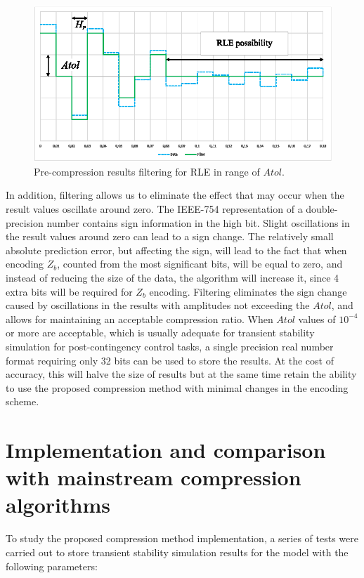 \documentclass[conference]{IEEEtran}
\begin{document}
\begin{figure}[htbp]
	\centering
	\includegraphics[width=0.8\columnwidth]{fig5.eps}
	\caption{Pre-compression results filtering for RLE in range of \(Atol\).}
	\label{fig_rle}
\end{figure}

In addition, filtering allows us to eliminate the effect that may occur when the result values oscillate around zero. 
The IEEE-754 representation of a double-precision number contains sign information in the high bit. 
Slight oscillations in the result values around zero can lead to a sign change. The relatively 
small absolute prediction error, but affecting the sign, will lead to the fact that when encoding \(Z_b\), 
counted from the most significant bits, will be equal to zero, and instead of reducing the size of the data, 
the algorithm will increase it, since 4 extra bits will be required for \(Z_b\) encoding. 
Filtering eliminates the sign change caused by oscillations in the results with amplitudes not exceeding 
the \(Atol\), and allows for maintaining an acceptable compression ratio.
When \(Atol\) values of \(10^{-4}\) or more are acceptable, which is usually adequate for transient stability
simulation for post-contingency control tasks, a single precision real number format requiring only 32 bits 
can be used to store the results. 
At the cost of accuracy, this will halve the size of results but at the same time retain the ability to 
use the proposed compression method with minimal changes in the encoding scheme.

\section{Implementation and comparison with mainstream compression algorithms}
To study the proposed compression method implementation, a series of tests were carried out to store 
transient stability simulation results for the model with the following parameters:
\end{document}
